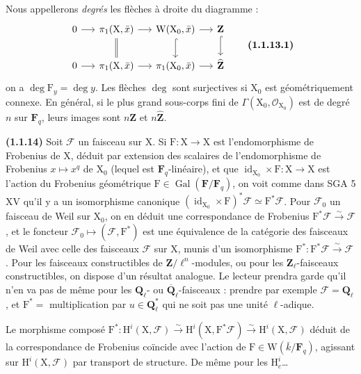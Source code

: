 \documentclass[11pt,leqno]{article}
\newcommand{\Page}[1]{\ifvmode\noindent\else\unskip\ \fi{\footnotesize\textcolor{gray}{[p.\,#1]}}\ \ignorespaces}
\begin{document}
\Page{153}

Nous appellerons \textit{degrés} les flèches à droite du diagramme :
\[
\begin{tikzcd}[column sep=1.4em,row sep=1.8em]
0 \arrow[r]
  & \pi_1(\mathrm{X},\bar{x}) \arrow[r] \arrow[d,equal]
  & \mathrm{W}(\mathrm{X}_0,\bar{x}) \arrow[r] \arrow[d,hook]
  & \mathbf{Z} \arrow[d,hook] \\
0 \arrow[r]
  & \pi_1(\mathrm{X},\bar{x}) \arrow[r]
  & \pi_1(\mathrm{X}_0,\bar{x}) \arrow[r]
  & \widehat{\mathbf{Z}}
\end{tikzcd}
\tag*{\textbf{(1.1.13.1)}}
\]
on a \(\deg \mathrm{F}_y=\deg y\). Les flèches \(\deg\) sont surjectives si \(\mathrm{X}_0\) est géométriquement connexe. En général, si le plus grand sous-corps fini de \(\Gamma(\mathrm{X}_0,\mathscr{O}_{\mathrm{X}_0})\) est de degré \(n\) sur \(\mathbf{F}_q\), leurs images sont \(n\mathbf{Z}\) et \(n\widehat{\mathbf{Z}}\).

\textbf{(1.1.14)} Soit \(\mathscr{F}\) un faisceau sur \(\mathrm{X}\). Si \(\mathrm{F}:\mathrm{X}\to\mathrm{X}\) est l’endomorphisme de Frobenius de \(\mathrm{X}\), déduit par extension des scalaires de l’endomorphisme de Frobenius \(x\mapsto x^q\) de \(\mathrm{X}_0\) (lequel est \(\mathbf{F}_q\)-linéaire), et que \(\operatorname{id}_{\mathrm{X}_0}\times\mathrm{F}:\mathrm{X}\to\mathrm{X}\) est l’action du Frobenius géométrique \(\mathrm{F}\in\operatorname{Gal}(\mathbf{F}/\mathbf{F}_q)\), on voit comme dans SGA 5 XV qu’il y a un isomorphisme canonique \((\operatorname{id}_{\mathrm{X}_0}\times\mathrm{F})^*\mathscr{F}\simeq\mathrm{F}^*\mathscr{F}\). Pour \(\mathscr{F}_0\) un faisceau de Weil sur \(\mathrm{X}_0\), on en déduit une correspondance de Frobenius \(\mathrm{F}^*\mathscr{F}\xrightarrow{\sim}\mathscr{F}\), et le foncteur \(\mathscr{F}_0\mapsto(\mathscr{F},\mathrm{F}^*)\) est une équivalence de la catégorie des faisceaux de Weil avec celle des faisceaux \(\mathscr{F}\) sur \(\mathrm{X}\), munis d’un isomorphisme \(\mathrm{F}^*:\mathrm{F}^*\mathscr{F}\xrightarrow{\sim}\mathscr{F}\). Pour les faisceaux constructibles de \(\mathbf{Z}/\ell^n\)-modules, ou pour les \(\mathbf{Z}_\ell\)-faisceaux constructibles, on dispose d’un résultat analogue. Le lecteur prendra garde qu’il n’en va pas de même pour les \(\mathbf{Q}_\ell\)- ou \(\overline{\mathbf{Q}}_\ell\)-faisceaux : prendre par exemple \(\mathscr{F}=\mathbf{Q}_\ell\), et \(\mathrm{F}^*=\) multiplication par \(u\in\mathbf{Q}_\ell^*\) qui ne soit pas une unité \(\ell\)-adique.

Le morphisme composé \(\mathrm{F}^*:\mathrm{H}^i(\mathrm{X},\mathscr{F})\xrightarrow{\sim}\mathrm{H}^i(\mathrm{X},\mathrm{F}^*\mathscr{F})\xrightarrow{\sim}\mathrm{H}^i(\mathrm{X},\mathscr{F})\) déduit de la correspondance de Frobenius coïncide avec l’action de \(\mathrm{F}\in\mathrm{W}(\bar{k}/\mathbf{F}_q)\), agissant sur \(\mathrm{H}^i(\mathrm{X},\mathscr{F})\) par transport de structure. De même pour les \(\mathrm{H}_c^i\)\ldots
\end{document}
